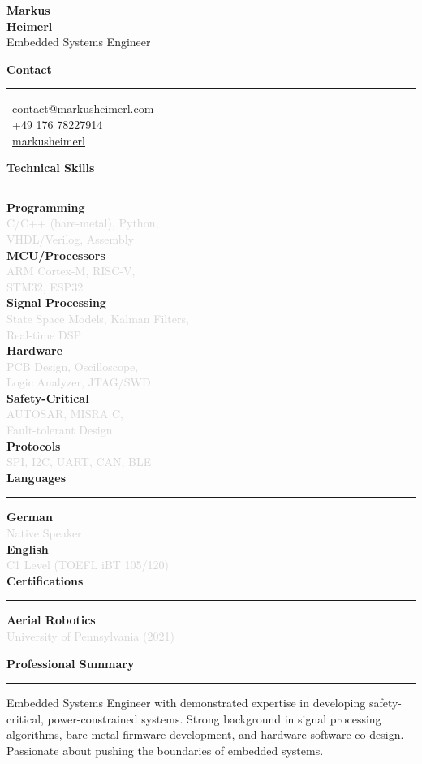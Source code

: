 \documentclass[a4paper,10pt]{article}
\newcommand{\cvsection}[1]{
    \vspace{12pt}
    {\large\bfseries\color{darkgray} #1}
    \vspace{4pt}
    \hrule
    \vspace{8pt}
}
\newcommand{\cvitem}[2]{
    \textbf{\color{darkgray}#1} \\
    \textcolor{lightgray}{\small #2} \\[5pt]
}
\begin{document}
\setlength{\columnsep}{0.8cm}
\begin{paracol}{2}


\vspace{0.5cm}

\begin{center}
    {\LARGE\bfseries\color{darkgray} Markus} \\[4pt]
    {\LARGE\bfseries\color{primaryblue} Heimerl} \\[8pt]
    {\small\color{darkgray} Embedded Systems Engineer}
\end{center}

\vspace{0.6cm}

\cvsection{Contact}
\small
\faEnvelope\, \href{mailto:contact@markusheimerl.com}{contact@markusheimerl.com} \\[5pt]
\faPhone\, +49 176 78227914 \\[5pt]
\faGithub\, \href{https://github.com/markusheimerl}{markusheimerl}

\cvsection{Technical Skills}
\cvitem{Programming}{C/C++ (bare-metal), Python,\\ VHDL/Verilog, Assembly}
\cvitem{MCU/Processors}{ARM Cortex-M, RISC-V,\\ STM32, ESP32}
\cvitem{Signal Processing}{State Space Models, Kalman Filters,\\ Real-time DSP}
\cvitem{Hardware}{PCB Design, Oscilloscope,\\ Logic Analyzer, JTAG/SWD}
\cvitem{Safety-Critical}{AUTOSAR, MISRA C,\\ Fault-tolerant Design}
\cvitem{Protocols}{SPI, I2C, UART, CAN, BLE}

\cvsection{Languages}
\cvitem{German}{Native Speaker}
\cvitem{English}{C1 Level (TOEFL iBT 105/120)}

\cvsection{Certifications}
\textbf{Aerial Robotics} \\
\textcolor{lightgray}{\small University of Pennsylvania (2021)}

\vspace{0.5cm}

\switchcolumn

\vspace{0.5cm}

\cvsection{Professional Summary}
Embedded Systems Engineer with demonstrated expertise in developing safety-critical, power-constrained systems. Strong background in signal processing algorithms, bare-metal firmware development, and hardware-software co-design. Passionate about pushing the boundaries of embedded systems.


\end{paracol}
\end{document}
